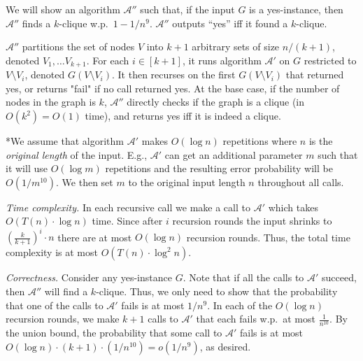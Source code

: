 We will show an algorithm $\mathcal{A}''$ such that, if the input $G$ is a yes-instance, then $\mathcal{A}''$ finds a $k$-clique w.p.\ $1-1/n^9$.
$\mathcal{A}''$ outputs ``yes'' iff it found a $k$-clique.

$\mathcal{A}''$ partitions the set of nodes $V$ into $k+1$ arbitrary sets of size $n/(k+1)$, denoted $V_1,\ldots V_{k+1}$.
For each $i\in [k+1]$, it runs algorithm $\mathcal{A}'$ on $G$ restricted to $V \setminus V_i$, denoted $G(V \setminus V_i)$. 
It then recurses on the first $G(V \setminus V_i)$ that returned yes, or returns "fail" if no call returned yes.
At the base case, if the number of nodes in the graph is $k$, $\mathcal{A}''$ directly checks if the graph is a clique (in $O(k^2) = O(1)$ time), and returns yes iff it is indeed a clique.

*We assume that algorithm $\mathcal{A}'$ makes $O(\log n)$ repetitions where $n$ is the \emph{original length} of the input.
E.g., $\mathcal{A}'$ can get an additional parameter $m$ such that it will use $O(\log m)$ repetitions and the resulting error probability will be $O(1/m^{10})$. 
We then set $m$ to the original input length $n$ throughout all calls. 

\textit{Time complexity.} In each recursive call we make a call to $\mathcal{A}'$ which takes $O(T(n) \cdot \log n)$ time.
Since after $i$ recursion rounds the input shrinks to $(\frac{k}{k+1})^i\cdot n$  
there are at most $O(\log n)$ recursion rounds.
Thus, the total time complexity is at most $O(T(n) \cdot \log^2 n)$. 

\textit{Correctness.}
Consider any yes-instance $G$. 
Note that if all the calls to $\mathcal{A}'$ succeed, then $\mathcal{A}''$ will find a $k$-clique. 
Thus, we only need to show that the probability that one of the calls to $\mathcal{A}'$ fails is at most $1/n^9$.
In each of the $O(\log n)$ recursion rounds, we make $k+1$ calls to $\mathcal{A}'$ that each fails w.p.\ at most $\frac{1}{n^{10}}$.
By the union bound, the probability that some call to $\mathcal{A}'$ fails is at most $O(\log n) \cdot (k+1) \cdot (1/n^{10}) = o(1/n^{9})$, as desired.

